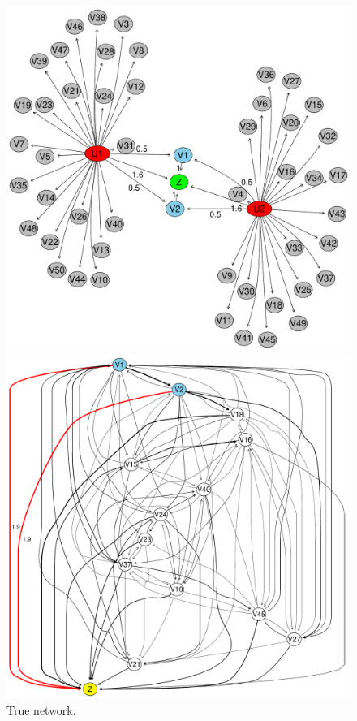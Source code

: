 \documentclass[letterpaper]{article}
\begin{document}
\begin{figure}[ht!]
  \centering
  \begin{minipage}[t]{0.29\linewidth}
    \includegraphics[width=\linewidth]{./images/true_network.pdf}
    \caption{\label{fig_truenet}True network. }
  \end{minipage}\hfill
   \begin{minipage}[t]{0.33\linewidth}
     \includegraphics[width=\linewidth]{./images/estimated_network_missingdata.pdf}

\end{minipage}
\end{figure}
\end{document}
